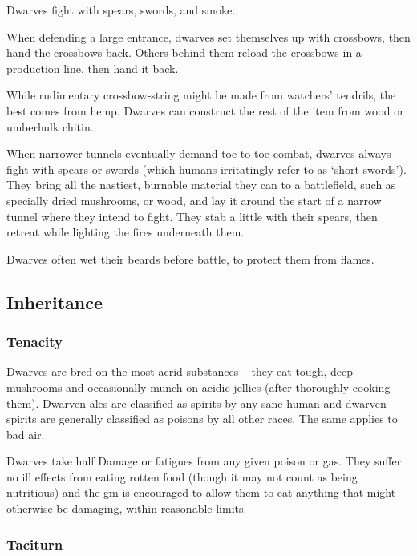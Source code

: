 \begin{multicols}{2}
Dwarves fight with spears, swords, and smoke.

When defending a large entrance, dwarves set themselves up with crossbows, then hand the crossbows back.
Others behind them reload the crossbows in a production line, then hand it back.

While rudimentary crossbow-string might be made from watchers' tendrils,%
the best comes from hemp.
Dwarves can construct the rest of the item from wood or umberhulk chitin.

When narrower tunnels eventually demand toe-to-toe combat, dwarves always fight with spears or swords (which humans irritatingly refer to as `short swords').
They bring all the nastiest, burnable material they can to a battlefield, such as specially dried mushrooms, or wood, and lay it around the start of a narrow tunnel where they intend to fight.
They stab a little with their spears, then retreat while lighting the fires underneath them.

Dwarves often wet their beards before battle, to protect them from flames.

\subsection{Inheritance}

\subsubsection[Tenacity: dwarves take only half the usual penalties from rotten food, poisons, or foul air.]{Tenacity}
\label{dwarvenInheritance}

Dwarves are bred on the most acrid substances -- they eat tough, deep mushrooms and occasionally munch on acidic jellies (after thoroughly cooking them).
Dwarven ales are classified as spirits by any sane human and dwarven spirits are generally classified as poisons by all other races.
The same applies to bad air.

Dwarves take half Damage or \glspl{fatigue} from any given poison or gas.
They suffer no ill effects from eating rotten food (though it may not count as being nutritious) and the \gls{gm} is encouraged to allow them to eat anything that might otherwise be damaging, within reasonable limits.

\subsubsection{Taciturn}


\end{multicols}
